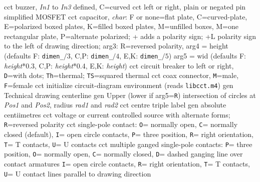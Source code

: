   {cct}
  {buzzer, {\sl In1} to {\sl In3} defined, C=curved
   }
  {cct}
  {left or right, plain or negated pin simplified MOSFET}
  {cct}
  {capacitor, {\sl char}: F or none=flat plate, C=curved-plate,
    E=polarized boxed plates,
    K=filled boxed plates,
    M=unfilled boxes,
    M=one rectangular plate,
    P=alternate polarized; + adds a polarity sign;
    +L polarity sign to the left of drawing direction;
    arg3:  R=reversed polarity,
    arg4 = height (defaults F: {\tt dimen\_}$/3$,
      C,P: {\tt dimen\_}$/4$, E,K: {\tt dimen\_}$/5$)
    arg5 = wid (defaults F: {\sl height}*0.3,
      C,P: {\sl height}*0.4, E,K: {\sl height}) }
  {cct}
  {circuit breaker to left or right, {\tt D}=with dots; {\tt Th}=thermal;
   {\tt TS}=squared thermal}
  {cct}
  {coax connector, {\tt M}=male, {\tt F}=female
    }
  {cct}
  {initialize circuit-diagram environment (reads {\tt libcct.m4})}
  {gen}
  {Technical drawing centerline}
  {gen}
  {Upper (lower if arg5={\tt R}) intersection of circles at
    {\sl Pos1} and {\sl Pos2}, radius {\sl rad1} and {\sl rad2}}
  {cct}
  {centre triple label }
  {gen}
  {absolute centiimetres}
  {cct}
  {voltage or current controlled source with alternate forms;
   {\tt R}=reversed polarity}
  {cct}
  {single-pole contact:
   {\tt O}= normally open,
   {\tt C}= normally closed (default),
   {\tt I}= open circle contacts,
   {\tt P}= three position,
   {\tt R}= right orientation,
   {\tt T}= T contacts,
   {\tt U}= U contacts
   }
  {cct}
  {multiple ganged single-pole contacts:
   {\tt P}= three position,
   {\tt O}= normally open,
   {\tt C}= normally closed,
   {\tt D}= dashed ganging line over contact armatures
   {\tt I}= open circle contacts,
   {\tt R}= right orientation,
   {\tt T}= T contacts,
   {\tt U}= U contact lines parallel to drawing direction
   }
